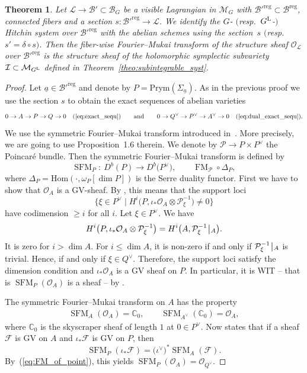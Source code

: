 \documentclass[pdftex]{sigma}
\numberwithin{equation}{section}
\newtheorem{theo}{Theorem}[section]
\theoremstyle{definition}
\newcommand{\Hom}{\mathrm{Hom}}
\newcommand{\reg}{\mathrm{reg}}
\renewcommand{\and}{\mathrm{and}}
\newcommand{\rest}{\: \rule[-3.5pt]{0.5pt}{11.5pt}\,{}}
\renewcommand{\to}{\rightarrow}
\newcommand{\calB}{\mathcal{B}}
\newcommand{\calF}{\mathcal{F}}
\newcommand{\calI}{\mathcal{I}}
\newcommand{\calL}{\mathcal{L}}
\newcommand{\calM}{\mathcal{M}}
\newcommand{\calO}{\mathcal{O}}
\newcommand{\calP}{\mathcal{P}}
\newcommand{\CC}{\mathbb{C}}
\DeclareMathOperator{\SFM}{SFM}
\DeclareMathOperator{\FM}{FM}
\newcommand{\Prym}{\mathrm{Prym}}
\begin{document}
\begin{theo}\label{theo:FM} Let $\calL \to \calB'\subset \calB_{G}$ be a visible Lagrangian in $\calM_G$ with $\calB'^\reg \subset \calB^\reg$, connected fibers and a section $s\colon \calB'^\reg \to \calL$. We identify the $G$- $($resp.\ $G^{\rm L}$-$)$ Hitchin system over $\calB'^\reg$ with the abelian schemes using the section~$s$ $($resp.\ $s'=\delta \circ s)$. Then the fiber-wise Fourier--Mukai transform of the structure sheaf $\calO_{\calL}$ over $\calB'^\reg$ is the structure sheaf of the holomorphic symplectic subvariety $\calI \subset \calM_{G^{\rm L}}$ defined in Theorem~{\rm \ref{theo:subintegrable_syst}}.
\end{theo}
\begin{proof}
 Let $\underline{a} \in \calB'^\reg$ and denote by $P=\Prym(\Sigma_{\underline{a}})$. As in the previous proof we use the section $s$ to obtain the exact sequences of abelian varieties
 \[ 0 \to A \to P \to Q \to 0 \quad (\ref{eq:exact_sequ}) \qquad \and \qquad 0 \to Q^\vee \to P^\vee \to A^\vee \to 0 \quad (\ref{eq:dual_exact_sequ}).
 \]
 We use the symmetric Fourier--Mukai transform introduced in~\cite{Schnell}. More precisely, we are going to use Proposition~1.6 therein. We denote by $\calP \to P \times P^\vee$ the Poincar\'e bundle. Then the symmetric Fourier--Mukai transform is defined by
 \[ \SFM_P\colon \ D^b(P) \to D^b\bigl(P^\vee\bigr), \qquad \FM_{\calP} \circ \Delta_P,
 \]
 where $\Delta_P=\Hom(\cdot,\omega_P[\dim P])$ is the Serre duality functor. First we have to show that $\calO_A$ is a GV-sheaf. By \cite[Definition~3.1]{PareschiPopa}, this means that the support loci
 \[ \bigl\{ \xi \in P^\vee \mid H^i\bigl(P,\iota_*\calO_A \otimes \calP_\xi^{-1}\bigr)\neq 0 \bigr\}
 \]
 have codimension $\geq i$ for all $i$. Let $\xi \in P^\vee$. We have
 \[ H^i\bigl(P,\iota_*\calO_A \otimes \calP_\xi^{-1}\bigr)=H^i\bigl(A,\calP_\xi^{-1}\rest_{A}\bigr).
 \]
 It is zero for $i > \dim A$. For $i \leq \dim A$, it is non-zero if and only if $\calP_\xi^{-1} \rest_A$ is trivial. Hence, if and only if $\xi \in Q^\vee$. Therefore, the support loci satisfy the dimension condition and $\iota_*\calO_A$ is a GV sheaf on $P$. In particular, it is WIT -- that is $\SFM_P(\calO_A)$ is a sheaf -- by \cite[Proposition~3.2]{PareschiPopa}.

 The symmetric Fourier--Mukai transform on $A$ has the property
 \begin{align} \label{eq:FM_of_point} \SFM_A(\calO_A)=\CC_0, \qquad \SFM_{A^\vee}(\CC_0) = \calO_{A},
 \end{align}
 where $\CC_0$ is the skyscraper sheaf of length $1$ at $0 \in P^\vee$. Now \cite[Proposition~1.6]{Schnell} states that if a sheaf $\calF$ is GV on $A$ and $\iota_*\calF$ is GV on $P$, then
 \[ \SFM_P(\iota_*\calF)=\bigl(\iota^\vee\bigr)^*\SFM_A(\calF).
 \]
 By~(\ref{eq:FM_of_point}), this yields $\SFM_P(\calO_A)=\calO_{Q^\vee}$.
\end{proof}
\end{document}
